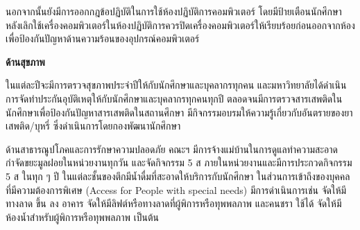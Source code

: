 นอกจากนั้นยังมีการออกกฎข้อปฏิบัติในการใช้ห้องปฏิบัติการคอมพิวเตอร์ โดยมีป้ายเตือนนักศึกษา หลังเลิกใช้เครื่องคอมพิวเตอร์ในห้องปฏิบัติการควรปิดเครื่องคอมพิวเตอร์ให้เรียบร้อยก่อนออกจากห้อง เพื่อป้องกันปัญหาด้านความร้อนของอุปกรณ์คอมพิวเตอร์

{\bf ด้านสุขภาพ}

ในแต่ละปีจะมีการตรวจสุขภาพประจำปีให้กับนักศึกษาและบุคลากรทุกคน และมหาวิทยาลัยได้ดำเนินการจัดทำประกันอุบัติเหตุให้กับนักศึกษาและบุคลากรทุกคนทุกปี ตลอดจนมีการตรวจสารเสพติดในนักศึกษาเพื่อป้องกันปัญหาสารเสพติดในสถานศึกษา มีกิจกรรมอบรมให้ความรู้เกี่ยวกับอันตรายของยาเสพติด/บุหรี่ ซึ่งดำเนินการโดยกองพัฒนานักศึกษา

ด้านสาธารณูปโภคและการรักษาความปลอดภัย
คณะฯ มีการจ้างแม่บ้านในการดูแลทำความสะอาดกำจัดขยะมูลฝอยในหน่วยงานทุกวัน และจัดกิจกรรม 5 ส ภายในหน่วยงานและมีการประกวดกิจกรรม 5 ส ในทุก ๆ ปี ในแต่ละชั้นของตึกมีน้ำดื่มที่สะอาดให้บริการกับนักศึกษา
ในส่วนการเข้าถึงของบุคคลที่มีความต้องการพิเศษ (Access for People with special needs) มีการดำเนินการเช่น จัดให้มีทางลาด ขึ้น ลง อาคาร จัดให้มีลิฟต์หรือทางลาดที่ผู้พิการหรือทุพพลภาพ และคนชรา ใช้ได้  จัดให้มีห้องน้ำสำหรับผู้พิการหรือทุพพลภาพ เป็นต้น


\begin{doclist}
\end{doclist}

